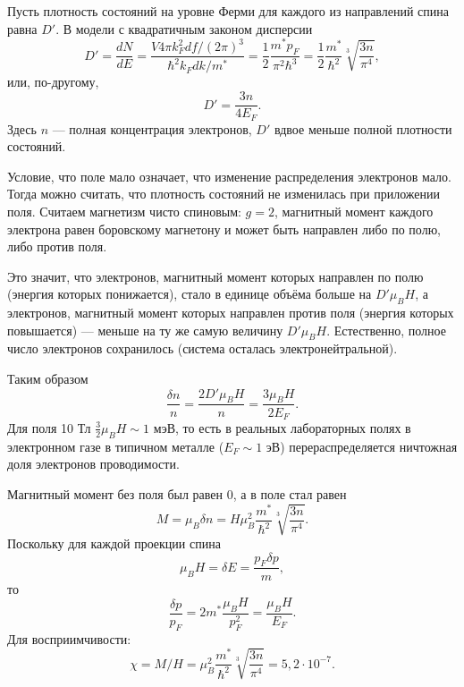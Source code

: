 \documentclass[a4paper]{article}
\begin{document}
\begin{hiProb}[3.59]
\end{hiProb}
\begin{sol}
Пусть плотность состояний на уровне Ферми для
каждого из направлений спина равна $D'$.
В модели с квадратичным законом дисперсии
\[
	D'=\frac{dN}{dE}= \frac{V 4 \pi k_F^2 df /(2\pi)^3}{
	\hbar ^2 k_F dk/ m^*} =\frac{1}{2}
	\frac{m^* p_F}{\pi^2 \hbar ^3}= \frac{1}{2}
	\frac{m^*}{\hbar ^2} \sqrt[3]{\frac{3n}{\pi^4}} 
,\]
или, по-другому, \[D'= \frac{3n}{4 E_F}.\] Здесь $n$ ---
полная концентрация электронов, $D'$ 
вдвое меньше  полной плотности состояний.

Условие, что поле мало означает, что изменение
распределения электронов мало. Тогда можно
считать, что плотность состояний не изменилась при
приложении поля. Считаем магнетизм чисто спиновым:
$g=2$, магнитный момент каждого  электрона
равен боровскому магнетону и может быть направлен
либо по полю, либо против поля.

Это значит, что электронов, магнитный момент
которых направлен по полю (энергия которых понижается),
стало в единице объёма больше на $D' \mu_B H$,
а электронов, магнитный момент которых направлен
против поля (энергия которых повышается) ---
меньше на ту же самую величину $D' \mu_B H$. Естественно, полное число электронов сохранилось (система
осталась электронейтральной).

Таким образом
 \[
\frac{\delta n}{n}= \frac{2 D' \mu_B H}{n}=
\frac{3\mu_B H}{2E_F}
.\] 
Для поля 10 Тл $\frac{3}{2}\mu_B H \sim 1$ мэВ,
то есть в реальных лабораторных полях в электронном
газе в типичном металле ($E_F \sim 1$ эВ) перераспределяется ничтожная доля электронов проводимости.

Магнитный момент без поля был равен 0, а в поле
стал равен  \[M=\mu_B \delta n= H \mu_B^2 \frac{m^*}{\hbar ^2}
\sqrt[3]{\frac{3n}{\pi^4}} .\]
Поскольку для каждой проекции спина
\[
\mu_B H= \delta E= \frac{p_F \delta p}{m}
,\] 
то
\[
\frac{\delta p}{p_F}=2 m^* \frac{\mu_B H}{p_F^2}=
\frac{\mu_B H}{E_F}
.\] 
Для восприимчивости:
\[
\chi= M /H = \mu_B^2 \frac{m^*}{\hbar ^2}
\sqrt[3]{\frac{3n}{\pi^4}} =5,2 \cdot 10^{-7}
.\] 
\end{sol}
\begin{hiProb}[3.87]
\end{hiProb}
\end{document}
